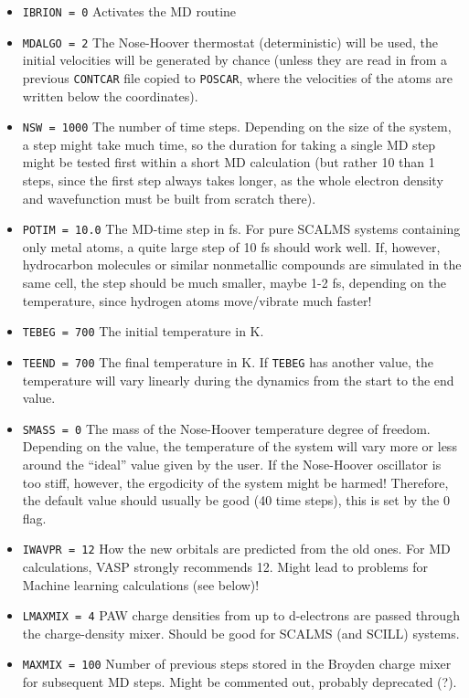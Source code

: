 \documentclass[a4paper,11pt]{article}
\begin{document}
\begin{itemize}
 \item \texttt{IBRION = 0} Activates the MD routine
 \item \texttt{MDALGO = 2} The Nose-Hoover thermostat (deterministic) will be used,
 the initial velocities will be generated by chance (unless they are read in from 
 a previous \texttt{CONTCAR} file copied to \texttt{POSCAR}, where the velocities 
 of the atoms are written below the coordinates).
 \item \texttt{NSW = 1000} The number of time steps. Depending on the size of the system, a step
 might take much time, so the duration for taking a single MD step might be tested first
 within a short MD calculation (but rather 10 than 1 steps, since the first step always takes 
 longer, as the whole electron density and wavefunction must be built from scratch there).
 \item \texttt{POTIM = 10.0} The MD-time step in fs. For pure SCALMS systems containing only
 metal atoms, a quite large step of 10 fs should work well. If, however, hydrocarbon
 molecules or similar nonmetallic compounds are simulated in the same cell, the step should be 
 much smaller, maybe 1-2 fs, depending on the temperature, since hydrogen atoms move/vibrate much
 faster!
 \item \texttt{TEBEG = 700} The initial temperature in K.
 \item \texttt{TEEND = 700} The final temperature in K. If \texttt{TEBEG} has another value,
 the temperature will vary linearly during the dynamics from the start to the end value.
 \item \texttt{SMASS = 0} The mass of the Nose-Hoover temperature degree of freedom. Depending 
 on the value, the temperature of the system will vary more or less around the ``ideal''
 value given by the user. If the Nose-Hoover oscillator is too stiff, however, the
 ergodicity of the system might be harmed! Therefore, the default value should usually 
 be good (40 time steps), this is set by the 0 flag.
 \item \texttt{IWAVPR = 12} How the new orbitals are predicted from the old ones. For MD calculations,
 VASP strongly recommends 12. Might lead to problems for Machine learning calculations (see below)!
 \item \texttt{LMAXMIX = 4} PAW charge densities from up to d-electrons are passed through
 the charge-density mixer. Should be good for SCALMS (and SCILL) systems.
 \item \texttt{MAXMIX = 100} Number of previous steps stored in the Broyden charge mixer for 
 subsequent MD steps. Might be commented out, probably deprecated (?).
\end{itemize}
\end{document}
